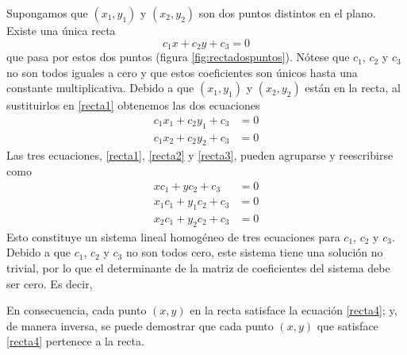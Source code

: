 Supongamos que $(x_1, y_1)$ y $(x_2, y_2)$ son dos puntos distintos en el plano. Existe una única recta
\begin{equation}
    c_1x + c_2y + c_3 = 0 \label{recta1}
\end{equation}
que pasa por estos dos puntos (figura \ref{fig:rectadospuntos}). Nótese que $c_1$, $c_2$ y $c_3$ no son todos iguales a cero y que estos coeficientes son únicos hasta una constante multiplicativa. Debido a que $(x_1, y_1)$ y $(x_2, y_2)$ están en la recta, al sustituirlos en \eqref{recta1} obtenemos las dos ecuaciones
\begin{align}
    c_1x_1 + c_2y_1 + c_3 & = 0 \label{recta2} \\
    c_1x_2 + c_2y_2 + c_3 & = 0 \label{recta3}
\end{align}
Las tres ecuaciones, \eqref{recta1}, \eqref{recta2} y \eqref{recta3}, pueden agruparse y reescribirse como
\begin{align*}
    x c_1 + y c_2 + c_3 & = 0 \\
    x_1 c_1 + y_1 c_2 + c_3 & = 0 \\
    x_2 c_1 + y_2 c_2 + c_3 & = 0
\end{align*}
Esto constituye un sistema lineal homogéneo de tres ecuaciones para $c_1$, $c_2$ y $c_3$. Debido a que $c_1$, $c_2$ y $c_3$ no son todos cero, este sistema tiene una solución no trivial, por lo que el determinante de la matriz de coeficientes del sistema debe ser cero. Es decir,
\begin{matriz}
     \label{recta4}
\end{matriz}
En consecuencia, cada punto $(x, y)$ en la recta satisface la ecuación \eqref{recta4}; y, de manera inversa, se puede demostrar que cada punto $(x, y)$ que satisface \eqref{recta4} pertenece a la recta.

